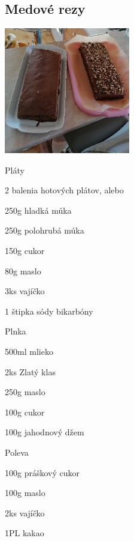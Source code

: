 \setcounter{step}{0}
\subsection{Medové rezy}

\begin{ingredient}
\includegraphics[height=5.5cm]{images/medove_rezy}
\def\portions{20}%

\begin{main}
\item
\end{main}
\begin{subingredient}{Pláty}
	\item 2 balenia hotových plátov, alebo
	\item 250g hladká múka
  \item 250g polohrubá múka
  \item 150g cukor
  \item 80g maslo
  \item 3ks vajíčko
  \item 1 štipka sódy bikarbóny
\end{subingredient}
\begin{subingredient}{Plnka}
	\item 500ml mlieko
	\item 2ks Zlatý klas
	\item 250g maslo
	\item 100g cukor
  \item 100g jahodnový džem
\end{subingredient}
\begin{subingredient}{Poleva}
	\item 100g práškový cukor
	\item 100g maslo
  \item 2ks vajíčko
  \item 1PL kakao
\end{subingredient}
\end{ingredient}
